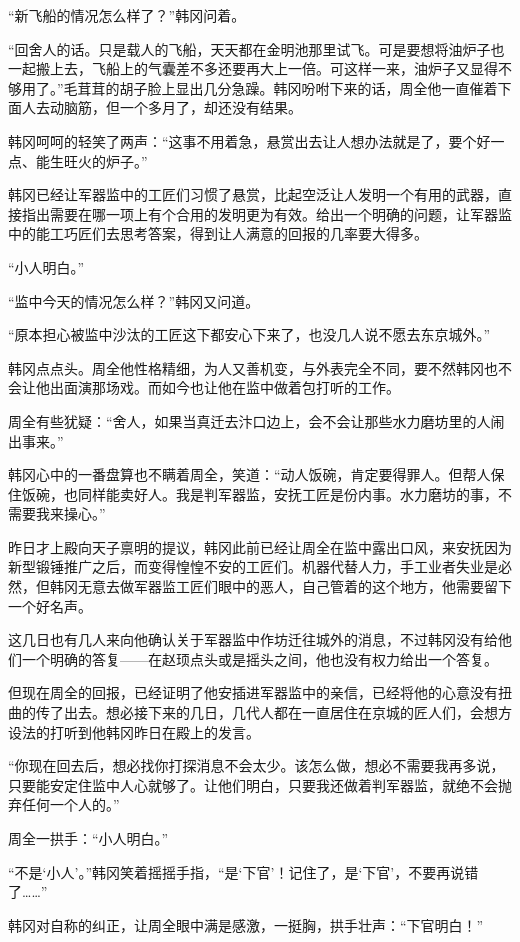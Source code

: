 “新飞船的情况怎么样了？”韩冈问着。

“回舍人的话。只是载人的飞船，天天都在金明池那里试飞。可是要想将油炉子也一起搬上去，飞船上的气囊差不多还要再大上一倍。可这样一来，油炉子又显得不够用了。”毛茸茸的胡子脸上显出几分急躁。韩冈吩咐下来的话，周全他一直催着下面人去动脑筋，但一个多月了，却还没有结果。

韩冈呵呵的轻笑了两声：“这事不用着急，悬赏出去让人想办法就是了，要个好一点、能生旺火的炉子。”

韩冈已经让军器监中的工匠们习惯了悬赏，比起空泛让人发明一个有用的武器，直接指出需要在哪一项上有个合用的发明更为有效。给出一个明确的问题，让军器监中的能工巧匠们去思考答案，得到让人满意的回报的几率要大得多。

“小人明白。”

“监中今天的情况怎么样？”韩冈又问道。

“原本担心被监中沙汰的工匠这下都安心下来了，也没几人说不愿去东京城外。”

韩冈点点头。周全他性格精细，为人又善机变，与外表完全不同，要不然韩冈也不会让他出面演那场戏。而如今也让他在监中做着包打听的工作。

周全有些犹疑：“舍人，如果当真迁去汴口边上，会不会让那些水力磨坊里的人闹出事来。”

韩冈心中的一番盘算也不瞒着周全，笑道：“动人饭碗，肯定要得罪人。但帮人保住饭碗，也同样能卖好人。我是判军器监，安抚工匠是份内事。水力磨坊的事，不需要我来操心。”

昨日才上殿向天子禀明的提议，韩冈此前已经让周全在监中露出口风，来安抚因为新型锻锤推广之后，而变得惶惶不安的工匠们。机器代替人力，手工业者失业是必然，但韩冈无意去做军器监工匠们眼中的恶人，自己管着的这个地方，他需要留下一个好名声。

这几日也有几人来向他确认关于军器监中作坊迁往城外的消息，不过韩冈没有给他们一个明确的答复——在赵顼点头或是摇头之间，他也没有权力给出一个答复。

但现在周全的回报，已经证明了他安插进军器监中的亲信，已经将他的心意没有扭曲的传了出去。想必接下来的几日，几代人都在一直居住在京城的匠人们，会想方设法的打听到他韩冈昨日在殿上的发言。

“你现在回去后，想必找你打探消息不会太少。该怎么做，想必不需要我再多说，只要能安定住监中人心就够了。让他们明白，只要我还做着判军器监，就绝不会抛弃任何一个人的。”

周全一拱手：“小人明白。”

“不是‘小人’。”韩冈笑着摇摇手指，“是‘下官’！记住了，是‘下官’，不要再说错了……”

韩冈对自称的纠正，让周全眼中满是感激，一挺胸，拱手壮声：“下官明白！”


